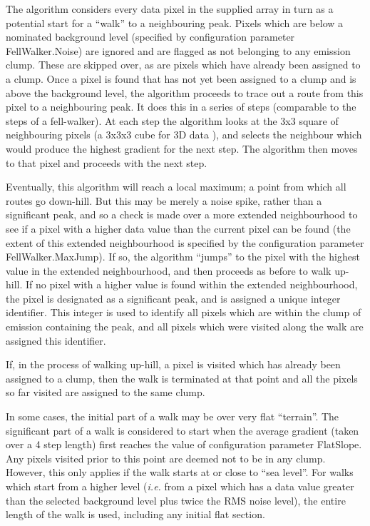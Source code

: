 \documentclass[twoside,11pt]{article}
\renewcommand{\_}{\texttt{\symbol{95}}}
\begin{document}
The algorithm considers every data pixel in the supplied array in turn as
a potential start for a ``walk'' to a neighbouring peak. Pixels which are
below a nominated background level (specified by configuration parameter
FellWalker.Noise) are ignored and are flagged as not belonging to any
emission clump. These are skipped over, as are pixels which have already
been assigned to a clump. Once a pixel is found that has not yet been
assigned to a clump and is above the background level, the algorithm
proceeds to trace out a route from this pixel to a neighbouring peak. It
does this in a series of steps (comparable to the steps of a
fell-walker). At each step the algorithm looks at the 3x3 square of
neighbouring pixels (a 3x3x3 cube for 3D data ), and selects the
neighbour which would produce the highest gradient for the next step. The
algorithm then moves to that pixel and proceeds with the next step.

Eventually, this algorithm will reach a local maximum; a point from which
all routes go down-hill. But this may be merely a noise spike, rather
than a significant peak, and so a check is made over a more extended
neighbourhood to see if a pixel with a higher data value than the current
pixel can be found (the extent of this extended neighbourhood is
specified by the configuration parameter FellWalker.MaxJump). If so, the
algorithm ``jumps'' to the pixel with the highest value in the extended
neighbourhood, and then proceeds as before to walk up-hill. If no pixel
with a higher value is found within the extended neighbourhood, the pixel
is designated as a significant peak, and is assigned a unique integer
identifier. This integer is used to identify all pixels which are within
the clump of emission containing the peak, and all pixels which were
visited along the walk are assigned this identifier.

If, in the process of walking up-hill, a pixel is visited which has
already been assigned to a clump, then the walk is terminated at that
point and all the pixels so far visited are assigned to the same clump.

In some cases, the initial part of a walk may be over very flat
``terrain''. The significant part of a walk is considered to start when
the average gradient (taken over a 4 step length) first reaches the value
of configuration parameter FlatSlope. Any pixels visited prior to this point
are deemed not to be in any clump. However, this only applies if the
walk starts at or close to ``sea level''. For walks which start from a 
higher level (\emph{i.e.} from a pixel which has a data value greater than 
the selected background level plus twice the RMS noise level), the entire
length of the walk is used, including any initial flat section.
\end{document}
